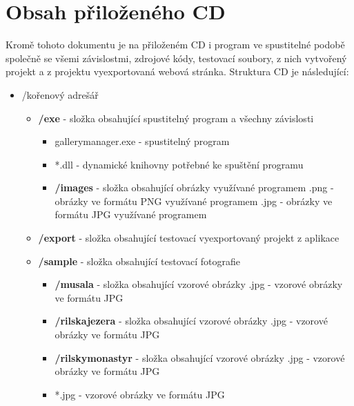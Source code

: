 \documentclass[11pt,twoside,a4paper]{book}
\begin{document}
\chapter{Obsah přiloženého CD}
\noindent
Kromě tohoto dokumentu je na přiloženém CD i program ve spustitelné podobě společně se všemi závislostmi, zdrojové kódy, testovací soubory, z nich vytvořený projekt a z projektu vyexportovaná webová stránka. Struktura CD je následující:
\begin{itemize}
\item /kořenový adrešář
\begin{itemize}
\item \textbf{/exe} - složka obsahující spustitelný program a všechny závislosti
	\begin{itemize}
	\item gallerymanager.exe - spustitelný program
	\item *.dll - dynamické knihovny potřebné ke spuštění programu
	\item \textbf{/images} - složka obsahující obrázky využívané programem
		\subitem *.png - obrázky ve formátu PNG využívané programem
		\subitem *.jpg - obrázky ve formátu JPG využívané programem
	\end{itemize}

\item \textbf{/export} - složka obsahující testovací vyexportovaný projekt z aplikace

\item \textbf{/sample} - složka obsahující testovací fotografie
	\begin{itemize}
	\item \textbf{/musala} - složka obsahující vzorové obrázky
	\subitem *.jpg - vzorové obrázky ve formátu JPG
	\item \textbf{/rilskajezera} - složka obsahující vzorové obrázky
	\subitem *.jpg - vzorové obrázky ve formátu JPG
	\item \textbf{/rilskymonastyr} - složka obsahující vzorové obrázky
	\subitem *.jpg - vzorové obrázky ve formátu JPG		
	\item *.jpg - vzorové obrázky ve formátu JPG
	\end{itemize}
	

\end{itemize}
\end{itemize}
\end{document}
